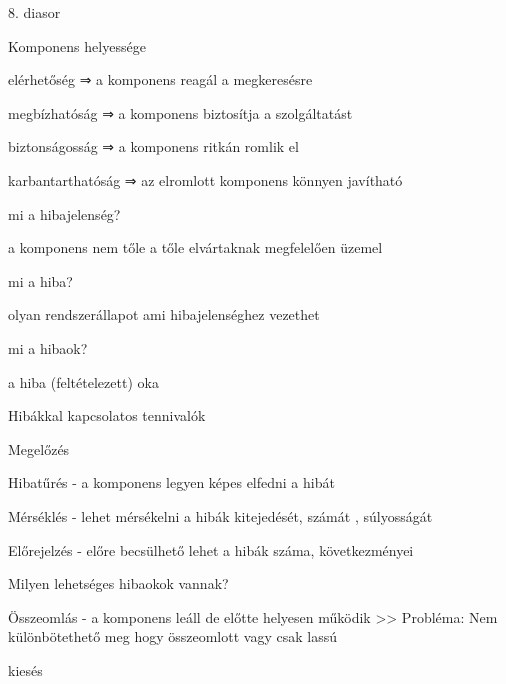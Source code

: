 \documentclass[twoside, a4paper, 12pt]{article}
\begin{document}
\begin{description}
                                        8. diasor
                                    \item  Komponens helyessége
                                    \item elérhetőség       ⇒ a komponens reagál a megkeresésre
                                    \item megbízhatóság     ⇒ a komponens biztosítja a szolgáltatást
                                    \item biztonságosság    ⇒ a komponens ritkán romlik el
                                    \item karbantarthatóság ⇒ az elromlott komponens könnyen javítható
                                    \item  mi a hibajelenség?
                                    \item a komponens nem tőle a tőle elvártaknak megfelelően üzemel
                                    \item  mi a hiba?
                                    \item olyan rendszerállapot ami hibajelenséghez vezethet
                                    \item  mi a hibaok?
                                    \item a hiba (feltételezett) oka
                                    \item  Hibákkal kapcsolatos tennivalók
                                    \item Megelőzés
                                    \item Hibatűrés
                                        - a komponens legyen képes elfedni a hibát
                                    \item Mérséklés
                                        - lehet mérsékelni a hibák kitejedését, számát , súlyosságát
                                    \item Előrejelzés
                                        - előre becsülhető lehet a hibák száma, következményei
                                    \item  Milyen lehetséges hibaokok vannak?
                                    \item Összeomlás
                                        - a komponens leáll de előtte helyesen működik
                                        >> Probléma: Nem különbötethető meg hogy összeomlott vagy csak lassú 
                                    \item kiesés

\end{description}
\end{document}
